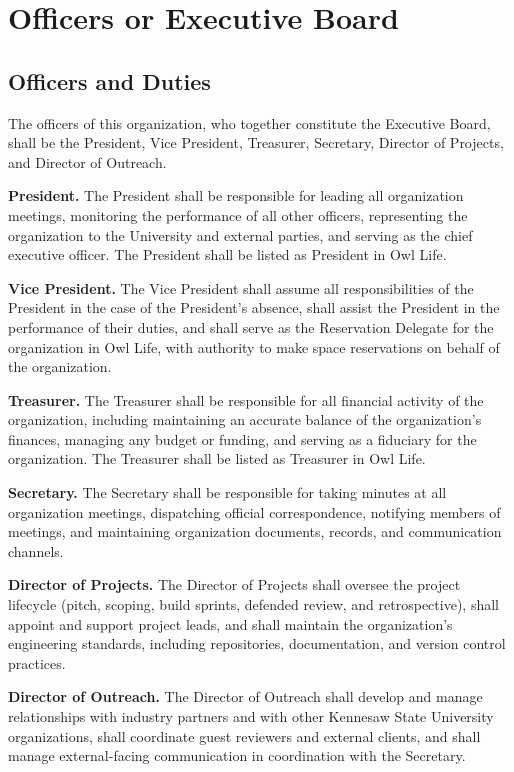 \documentclass[12pt,letterpaper]{article} %
\begin{document}
\section{Officers or Executive Board}\label{art:officers} %
\subsection{Officers and Duties}\label{sec:officer-duties}
The officers of this organization, who together constitute the Executive Board, shall be
the President, Vice President, Treasurer, Secretary, Director of Projects,
and Director of Outreach.
\begin{alphalist}
  \item \textbf{President.} The President shall be responsible for leading all organization
  meetings, monitoring the performance of all other officers, representing the organization
  to the University and external parties, and serving as the chief executive officer.
  The President shall be listed as President in Owl Life.
  \item \textbf{Vice President.} The Vice President shall assume all responsibilities of
  the President in the case of the President's absence, shall assist the President in the
  performance of their duties, and shall serve as the Reservation Delegate for the
  organization in Owl Life, with authority to make space reservations on behalf of the
  organization.
  \item \textbf{Treasurer.} The Treasurer shall be responsible for all financial activity
  of the organization, including maintaining an accurate balance of the organization's
  finances, managing any budget or funding, and serving as a fiduciary for the organization.
  The Treasurer shall be listed as Treasurer in Owl Life.
  \item \textbf{Secretary.} The Secretary shall be responsible for taking minutes at all
  organization meetings, dispatching official correspondence, notifying members of meetings,
  and maintaining organization documents, records, and communication channels.
  \item \textbf{Director of Projects.} The Director of Projects shall oversee the project
  lifecycle (pitch, scoping, build sprints, defended review, and retrospective), shall
  appoint and support project leads, and shall maintain the organization's engineering
  standards, including repositories, documentation, and version control practices.
  \item \textbf{Director of Outreach.} The Director of Outreach shall develop and manage
  relationships with industry partners and with other Kennesaw State University
  organizations, shall coordinate guest reviewers and external clients, and shall manage
  external-facing communication in coordination with the Secretary.
\end{alphalist}
\end{document}

